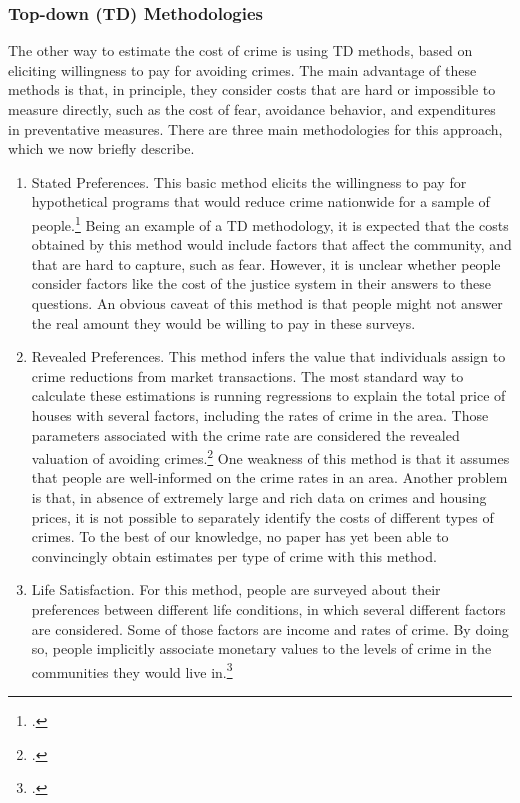 \subsubsection{Top-down (TD) Methodologies}
\noindent The other way to estimate the cost of crime is using TD methods, based on eliciting willingness to pay for avoiding crimes. The main advantage of these methods is that, in principle, they consider costs that are hard or impossible to measure directly, such as the cost of fear, avoidance behavior, and expenditures in preventative measures. There are three main methodologies for this approach, which we now briefly describe. \\

\begin{enumerate}
\item Stated Preferences. This basic method elicits the willingness to pay for hypothetical programs that would reduce crime nationwide for a sample of people.\footnote{\citet{Cohen_Rust_etal_2004_Criminology}.} Being an example of a TD methodology, it is expected that the costs obtained by this method would include factors that affect the community, and that are hard to capture, such as fear. However, it is unclear whether people consider factors like the cost of the justice system in their answers to these questions. An obvious caveat of this method is that people might not answer the real amount they would be willing to pay in these surveys.
\item Revealed Preferences. This method infers the value that individuals assign to crime reductions from market transactions. The most standard way to calculate these estimations is running regressions to explain the total price of houses with several factors, including the rates of crime in the area. Those parameters associated with the crime rate are considered the revealed valuation of avoiding crimes.\footnote{\citet{Thaler_1978_Value-Crime-Control}.} One weakness of this method is that it assumes that people are well-informed on the crime rates in an area. Another problem is that, in absence of extremely large and rich data on crimes and housing prices, it is not possible to separately identify the costs of different types of crimes. To the best of our knowledge, no paper has yet been able to convincingly obtain estimates per type of crime with this method.
\item Life Satisfaction. For this method, people are surveyed about their preferences between different life conditions, in which several different factors are considered. Some of those factors are income and rates of crime. By doing so, people implicitly associate monetary values to the levels of crime in the communities they would live in.\footnote{\citet{ Moore_etal_2006_Cost-of-Fear,Moore_2006_Value-Reducing-Fear}.}
\end{enumerate}

